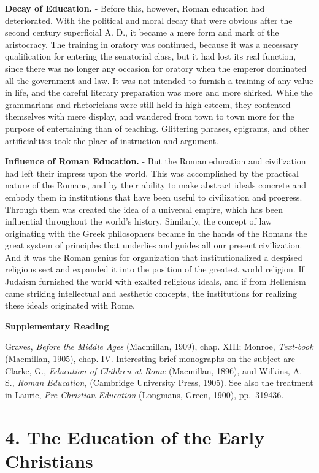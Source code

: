 \documentclass[]{book}
\begin{document}
\textbf{Decay of Education.} - Before this, however, Roman education had deteriorated. With the political and moral decay that were obvious after the second century superficial A. D., it became a mere form and mark of the aristocracy. The training in oratory was continued, because it was a necessary qualification for entering the senatorial class, but it had lost its real function, since there was no longer any occasion for oratory when the emperor dominated all the government and law. It was not intended to furnish a training of any value in life, and the careful literary preparation was more and more shirked. While the grammarians and rhetoricians were still held in high esteem, they contented themselves with mere display, and wandered from town to town more for the purpose of entertaining than of teaching. Glittering phrases, epigrams, and other artificialities took the place of instruction and argument.

\textbf{Influence of Roman Education.} - But the Roman education and civilization had left their impress upon the world. This was accomplished by the practical nature of the Romans, and by their ability to make abstract ideals concrete and embody them in institutions that have been useful to civilization and progress. Through them was created the idea of a universal empire, which has been influential throughout the world's history. Similarly, the concept of law originating with the Greek philosophers became in the hands of the Romans the great system of principles that underlies and guides all our present civilization. And it was the Roman genius for organization that institutionalized a despised religious sect and expanded it into the position of the greatest world religion. If Judaism furnished the world with exalted religious ideals, and if from Hellenism came striking intellectual and aesthetic concepts, the institutions for realizing these ideals originated with Rome.

\textbf{Supplementary Reading}

Graves, \emph{Before the Middle Ages} (Macmillan, 1909), chap. XIII; Monroe, \emph{Text-book} (Macmillan, 1905), chap. IV. Interesting brief monographs on the subject are Clarke, G., \emph{Education of Children at Rome} (Macmillan, 1896), and Wilkins, A. S., \emph{Roman Education,} (Cambridge University Press, 1905). See also the treatment in Laurie, \emph{Pre-Christian Education} (Longmans, Green, 1900), pp.~319436.

\hypertarget{the-education-of-the-early-christians}{%
\chapter{4. The Education of the Early Christians}\label{the-education-of-the-early-christians}}
\end{document}
